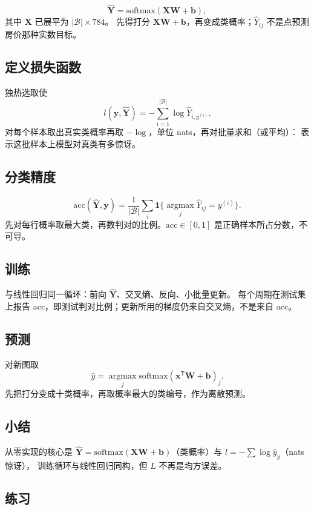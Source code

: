 \[
\hat{\bm{Y}}=\mathrm{softmax}(\bm{X}\bm{W}+\bm{b}),
\]
其中 $\bm{X}$ 已展平为 $|\mathcal{B}|\times 784$。
先得打分 $\bm{X}\bm{W}+\bm{b}$，再变成类概率；$\hat{Y}_{ij}$ 不是点预测房价那种实数目标。

\subsection{定义损失函数}

独热选取使
\[
l(\bm{y},\hat{\bm{Y}})=-\sum_{i=1}^{|\mathcal{B}|}\log\hat{Y}_{i,y^{(i)}}.
\]
对每个样本取出真实类概率再取 $-\log$，单位 nats，再对批量求和（或平均）：
表示这批样本上模型对真类有多惊讶。

\subsection{分类精度}

\[
\mathrm{acc}(\hat{\bm{Y}},\bm{y})
=
\frac{1}{|\mathcal{B}|}
\sum_{i}
\mathbf{1}\bigl\{\operatorname*{argmax}_{j}\hat{Y}_{ij}=y^{(i)}\bigr\}.
\]
先对每行概率取最大类，再数判对的比例。$\mathrm{acc}\in[0,1]$ 是正确样本所占分数，不可导。

\subsection{训练}

与线性回归同一循环：前向 $\hat{\bm{Y}}$、交叉熵、反向、小批量更新。
每个周期在测试集上报告 $\mathrm{acc}$，即测试判对比例；更新所用的梯度仍来自交叉熵，不是来自 $\mathrm{acc}$。

\subsection{预测}

对新图取
\[
\hat{y}=\operatorname*{argmax}_{j}\mathrm{softmax}(\bm{x}^{\mathsf T}\bm{W}+\bm{b})_{j}.
\]
先把打分变成十类概率，再取概率最大的类编号，作为离散预测。

\subsection{小结}

从零实现的核心是
$\hat{\bm{Y}}=\mathrm{softmax}(\bm{X}\bm{W}+\bm{b})$（类概率）与 $l=-\sum\log\hat{y}_{y}$（nats 惊讶），
训练循环与线性回归同构，但 $L$ 不再是均方误差。

\subsection{练习}

